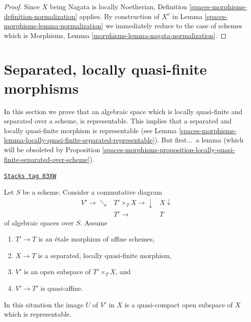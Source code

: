 \begin{proof}
Since $X$ being Nagata is locally Noetherian,
Definition \ref{spaces-morphisms-definition-normalization} applies.
By construction of $X^\nu$ in Lemma \ref{spaces-morphisms-lemma-normalization}
we immediately reduce to the case of schemes which is
Morphisms, Lemma \ref{morphisms-lemma-nagata-normalization}.
\end{proof}

\section{Separated, locally quasi-finite morphisms}
\label{spaces-morphisms-section-schemehood}
In this section we prove that an algebraic space which is locally
quasi-finite and separated over a scheme, is representable. This
implies that a separated and locally quasi-finite morphism is
representable (see
Lemma \ref{spaces-morphisms-lemma-locally-quasi-finite-separated-representable}).
But first...\ a lemma (which will be obsoleted by
Proposition \ref{spaces-morphisms-proposition-locally-quasi-finite-separated-over-scheme}).

\begin{lemma}
\label{spaces-morphisms-lemma-neighbourhood-scheme}
\href{https://stacks.math.columbia.edu/tag/03XW}{\texttt{Stacks tag 03XW}}

Let $S$ be a scheme. Consider a commutative diagram
$$
\begin{array}{ccc}V' \longrightarrow\searrow & T' \times_T X \longrightarrow\downarrow & X \downarrow \\  & T' \longrightarrow & T\end{array}
$$
of algebraic spaces over $S$. Assume
\begin{enumerate}
\item $T' \to T$ is an \'etale morphism of affine schemes,
\item $X \to T$ is a separated, locally quasi-finite morphism,
\item $V'$ is an open subspace of $T' \times_T X$, and
\item $V' \to T'$ is quasi-affine.
\end{enumerate}
In this situation the image $U$ of $V'$ in $X$ is a quasi-compact
open subspace of $X$ which is representable.
\end{lemma}

